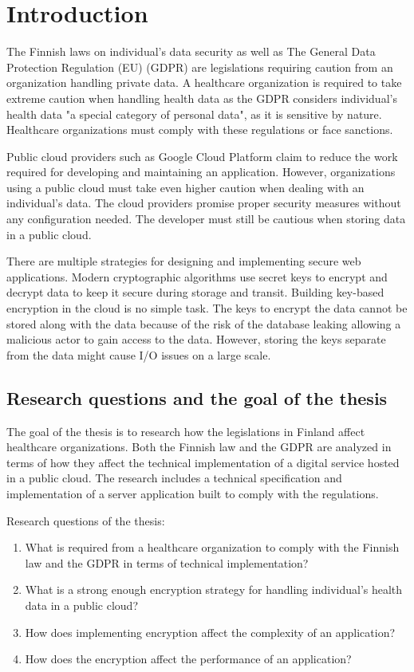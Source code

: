 \chapter{Introduction} \label{introduction}

The Finnish laws on individual's data security as well as The General Data Protection Regulation (EU) (GDPR) are legislations requiring caution from an organization handling private data.
A healthcare organization is required to take extreme caution when handling health data as the GDPR considers individual's health data "a special category of personal data", as it is sensitive by nature.
Healthcare organizations must comply with these regulations or face sanctions.

Public cloud providers such as Google Cloud Platform claim to reduce the work required for developing and maintaining an application.
However, organizations using a public cloud must take even higher caution when dealing with an individual's data.
The cloud providers promise proper security measures without any configuration needed.
The developer must still be cautious when storing data in a public cloud.

There are multiple strategies for designing and implementing secure web applications.
Modern cryptographic algorithms use secret keys to encrypt and decrypt data to keep it secure during storage and transit.
Building key-based encryption in the cloud is no simple task.
The keys to encrypt the data cannot be stored along with the data because of the risk of the database leaking allowing a malicious actor to gain access to the data.
However, storing the keys separate from the data might cause I/O issues on a large scale.

\section{Research questions and the goal of the thesis}

The goal of the thesis is to research how the legislations in Finland affect healthcare organizations.
Both the Finnish law and the GDPR are analyzed in terms of how they affect the technical implementation of a digital service hosted in a public cloud.
The research includes a technical specification and implementation of a server application built to comply with the regulations.

Research questions of the thesis:
\begin{enumerate}
    \item What is required from a healthcare organization to comply with the Finnish law and the GDPR in terms of technical implementation?
    \item What is a strong enough encryption strategy for handling individual's health data in a public cloud?
    \item How does implementing encryption affect the complexity of an application?
    \item How does the encryption affect the performance of an application? 
\end{enumerate}


